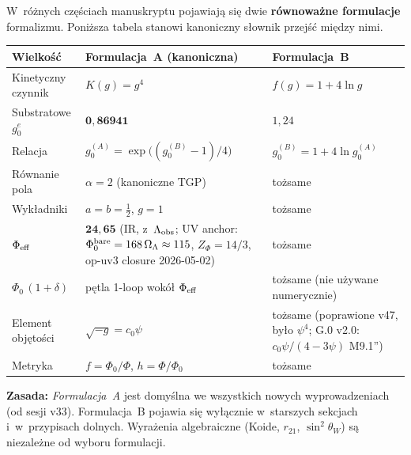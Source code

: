 \begin{remark}%
\label{rem:formulation-dictionary}
W~r\'o\.znych cz\k{e}\'sciach manuskryptu pojawiaj\k{a} si\k{e} dwie
\textbf{r\'ownowa\.zne formulacje} formalizmu. Poni\.zsza tabela
stanowi kanoniczny s\l{}ownik przej\'s\'c mi\k{e}dzy nimi.

\begin{center}\footnotesize
\begin{tabular}{@{}p{3cm}p{4.5cm}p{4.5cm}@{}}
\toprule
\textbf{Wielko\'s\'c} & \textbf{Formulacja~A} (kanoniczna)
  & \textbf{Formulacja~B} \\
\midrule
Kinetyczny czynnik & $K(g) = g^4$ & $f(g) = 1 + 4\ln g$ \\
Substratowe $g_0^e$ & $\mathbf{0{,}86941}$ & $1{,}24$ \\
Relacja & $g_0^{(A)} = \exp\!\bigl((g_0^{(B)} - 1)/4\bigr)$ &
  $g_0^{(B)} = 1 + 4\ln g_0^{(A)}$ \\
\midrule
R\'ownanie pola & $\alpha = 2$ (kanoniczne TGP) & to\.zsame \\
Wyk\l{}adniki & $a = b = \tfrac12$, $g = 1$ & to\.zsame \\
$\Phi_{\rm eff}$ & $\mathbf{24{,}65}$ (IR, z~$\Lambda_{\rm obs}$;
  UV anchor: $\Phi_0^{\rm bare} = 168\,\Omega_\Lambda \approx 115$,
  $Z_\Phi = 14/3$, op-uv3 closure 2026-05-02) & to\.zsame \\
$\Phi_0\,(1+\delta)$ & p\k{e}tla 1-loop wok\'o\l{} $\Phi_{\rm eff}$
  & to\.zsame (nie u\.zywane numerycznie) \\
\midrule
Element obj\k{e}to\'sci & $\sqrt{-g} = c_0\psi$
  & to\.zsame (poprawione v47, by\l{}o $\psi^4$;
    G.0 v2.0: $c_0\psi/(4{-}3\psi)$ M9.1'') \\
Metryka & $f = \Phi_0/\Phi$, $h = \Phi/\Phi_0$
  & to\.zsame \\
\bottomrule
\end{tabular}
\end{center}

\medskip\noindent
\textbf{Zasada:} \textit{Formulacja~A} jest domy\'slna we wszystkich
nowych wyprowadzeniach (od sesji v33).
Formulacja~B pojawia si\k{e} wy\l{}\k{a}cznie w~starszych sekcjach
i~w~przypisach dolnych.
Wyra\.zenia algebraiczne (Koide, $r_{21}$, $\sin^2\theta_W$)
s\k{a} niezale\.zne od wyboru formulacji.
\end{remark}

